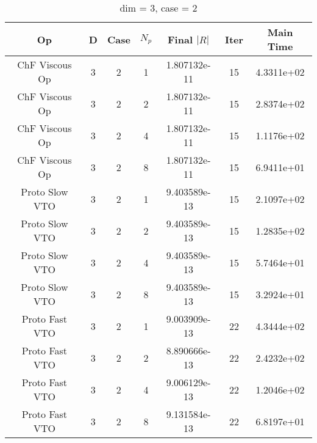 \documentclass{article}
\begin{document}
\begin{small} 
  \begin{table} [p]
    \begin{center}
      \begin{tabular}{|c|c|c|c|c|c||c|} \hline
        Op & D & Case & $N_p$ & Final $|R|$  &  Iter & Main Time \\
        \hline
        ChF Viscous Op & 3 & 2 & 1& 1.807132e-11 & 15 & 4.3311e+02\\
        ChF Viscous Op & 3 & 2 & 2& 1.807132e-11 & 15 & 2.8374e+02\\
        ChF Viscous Op & 3 & 2 & 4& 1.807132e-11 & 15 & 1.1176e+02\\
        ChF Viscous Op & 3 & 2 & 8& 1.807132e-11 & 15 & 6.9411e+01\\
        Proto Slow VTO & 3 & 2 & 1& 9.403589e-13 & 15 & 2.1097e+02\\
        Proto Slow VTO & 3 & 2 & 2& 9.403589e-13 & 15 & 1.2835e+02\\
        Proto Slow VTO & 3 & 2 & 4& 9.403589e-13 & 15 & 5.7464e+01\\
        Proto Slow VTO & 3 & 2 & 8& 9.403589e-13 & 15 & 3.2924e+01\\
        Proto Fast VTO & 3 & 2 & 1& 9.003909e-13 & 22 & 4.3444e+02\\
        Proto Fast VTO & 3 & 2 & 2& 8.890666e-13 & 22 & 2.4232e+02\\
        Proto Fast VTO & 3 & 2 & 4& 9.006129e-13 & 22 & 1.2046e+02\\
        Proto Fast VTO & 3 & 2 & 8& 9.131584e-13 & 22 & 6.8197e+01\\
        \hline
      \end{tabular} 
    \end{center}   
    \label{__dim_=_3__case_=_2} 
    \caption{dim = 3, case = 2} 
  \end{table} 
\end{small}
\end{document}
